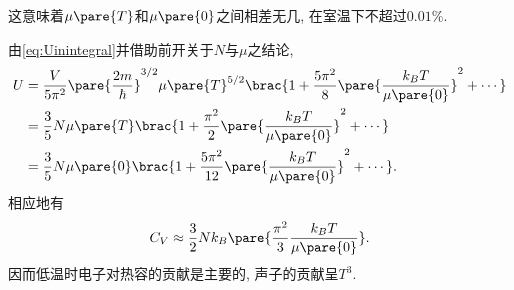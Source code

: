 \documentclass[../Thermal.tex]{subfiles}
\begin{document}
这意味着$\mu\pare{T}$和$\mu\pare{0}$之间相差无几, 在室温下不超过$0.01\%$.
\begin{ex}
由\eqref{eq:Uinintegral}并借助前开关于$N$与$\mu$之结论,
\begin{align*}
U &= \frac{V}{5\pi^2} \pare{\frac{2m}{\hbar}}^{3/2}\mu\pare{T}^{5/2}\brac{1+\frac{5\pi^2}{8}\pare{\frac{k_BT}{\mu\pare{0}}}^2+\cdots} \\
&= \frac{3}{5} N\mu\pare{T}\brac{1+\frac{\pi^2}{2}\pare{\frac{k_BT}{\mu\pare{0}}}^2+\cdots} \\
&= \frac{3}{5} N\mu\pare{0}\brac{1+\frac{5\pi^2}{12}\pare{\frac{k_BT}{\mu\pare{0}}}^2+\cdots}.
\end{align*}
相应地有
\[ C_V \approx \frac{3}{2}Nk_B\pare{\frac{\pi^2}{3}\frac{k_BT}{\mu\pare{0}}}. \]
因而低温时电子对热容的贡献是主要的, 声子的贡献呈$T^3$.
\end{ex}
\end{document}
